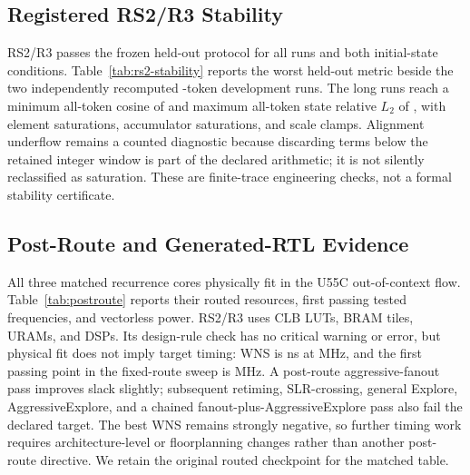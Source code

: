 \documentclass[conference]{IEEEtran}
\begin{document}
\subsection{Registered RS2/R3 Stability}
RS2/R3 passes the frozen held-out protocol for all \RsTwoHeldoutRuns{} runs and
both initial-state conditions. Table~\ref{tab:rs2-stability} reports the worst
held-out metric beside the two independently recomputed
\RsTwoLongTokens{}-token development runs. The long runs reach a minimum
all-token cosine of \RsTwoExtendedMinCosine{} and maximum all-token state
relative $L_2$ of \RsTwoExtendedMaxStateLTwo{}, with
\RsTwoExtendedElementSaturations{} element saturations,
\RsTwoExtendedAccumulatorSaturations{} accumulator saturations, and
\RsTwoExtendedScaleClamps{} scale clamps. Alignment underflow remains a counted
diagnostic because discarding terms below the retained integer window is part
of the declared arithmetic; it is not silently reclassified as saturation.
These are finite-trace engineering checks, not a formal stability certificate.

\begin{table}[t]
\centering
\caption{Registered RS2/R3 finite-trace stability. Rows aggregate independent
random- and zero-state runs; all metrics are measured against FP32.}
\label{tab:rs2-stability}
\scriptsize
\resizebox{\columnwidth}{!}{}
\end{table}

\subsection{Post-Route and Generated-RTL Evidence}
\label{sec:postroute}
All three matched recurrence cores physically fit in the U55C
out-of-context flow. Table~\ref{tab:postroute} reports their routed resources,
first passing tested frequencies, and vectorless power. RS2/R3 uses
\RsTwoRouteLut{} CLB LUTs, \RsTwoRouteBram{} BRAM tiles,
\RsTwoRouteUram{} URAMs, and \RsTwoRouteDsp{} DSPs. Its design-rule check has no
critical warning or error, but physical fit does not imply target timing: WNS
is \RsTwoRouteTargetWns{} ns at \RsTwoRouteTargetMhz{} MHz, and the first
passing point in the fixed-route sweep is \RsTwoRouteClosingMhz{} MHz. A
post-route aggressive-fanout pass improves slack slightly; subsequent
retiming, SLR-crossing, general Explore, AggressiveExplore, and a chained
fanout-plus-AggressiveExplore pass also fail the declared target. The best WNS
remains strongly negative, so further timing work requires architecture-level
or floorplanning changes rather than another post-route directive. We retain
the original routed checkpoint for the matched table.
\end{document}

